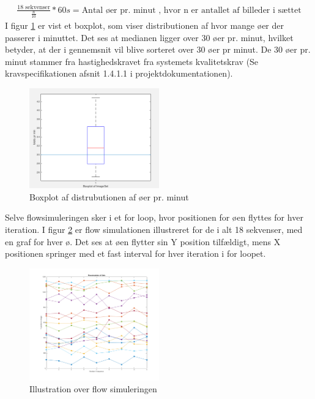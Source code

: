 \begin{align}
\frac{18\text{ sekvenser}}{\frac{n}{10}} * 60s = \text{Antal øer pr. minut}
\text{ , hvor n er antallet af billeder i sættet}
\label{formular:isletprmin}
\end{align} 
I figur \ref{fig:boxplot} er vist et boxplot, som viser distributionen af hvor mange øer der passerer i minuttet. Det ses at medianen ligger over 30 øer pr. minut, hvilket betyder, at der i gennemsnit vil blive sorteret over 30 øer pr minut. De 30 øer pr. minut stammer fra hastighedskravet fra systemets kvalitetskrav (Se kravspecifikationen afsnit 1.4.1.1 i projektdokumentationen).

 \begin{figure}[H]
	\centering
	\includegraphics[width=0.5\textwidth]{billeder/software/boxplot.png}
	\caption{Boxplot af distrubutionen af øer pr. minut}
	\label{fig:boxplot}
\end{figure}

Selve flowsimuleringen sker i et for loop, hvor positionen for øen flyttes for hver iteration. I figur \ref{fig:flowsim} er flow simulationen illustreret for de i alt 18 sekvenser, med en graf for hver ø. Det ses at øen flytter sin Y position tilfældigt, mens X positionen springer med et fast interval for hver iteration i for loopet.

\begin{figure}[H]
	\centering
	\includegraphics[width=0.5\textwidth]{billeder/software/Simulation.png}
	\caption{Illustration over flow simuleringen}
	\label{fig:flowsim}
\end{figure}


